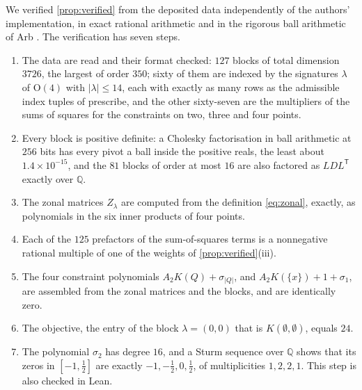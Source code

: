 \documentclass[11pt,reqno]{amsart}
\renewcommand{\_}{\origunderscore\allowbreak}
\numberwithin{equation}{section}
\theoremstyle{plain}
\theoremstyle{definition}
\theoremstyle{remark}
\begin{document}
We verified \cref{prop:verified} from the deposited data independently
of the authors' implementation, in exact rational arithmetic and in the
rigorous ball arithmetic of Arb \cite{Joh17}. The verification has seven
steps.
\begin{enumerate}[label=\textup{\arabic*.},leftmargin=2em,itemsep=0.12em]
\item The data are read and their format checked: $127$ blocks of total
      dimension $3726$, the largest of order $350$; sixty of them are
      indexed by the signatures $\lambda$ of $\mathrm O(4)$ with
      $|\lambda|\le14$, each with exactly as many rows as the admissible
      index tuples of \cite[\S3]{LLM24} prescribe, and the other
      sixty-seven are the multipliers of the sums of squares for the
      constraints on two, three and four points.
\item Every block is positive definite: a Cholesky factorisation in ball
      arithmetic at $256$ bits has every pivot a ball inside the positive
      reals, the least about $1.4\times10^{-15}$, and the $81$ blocks of
      order at most $16$ are also factored as $LDL^{\mathsf T}$ exactly
      over $\mathbb Q$.
\item The zonal matrices $Z_\lambda$ are computed from the definition
      \eqref{eq:zonal}, exactly, as polynomials in the six inner products
      of four points.
\item Each of the $125$ prefactors of the sum-of-squares terms is a
      nonnegative rational multiple of one of the weights of
      \cref{prop:verified}(iii).
\item The four constraint polynomials $A_2K(Q)+\sigma_{|Q|}$, and
      $A_2K(\{x\})+1+\sigma_1$, are assembled from the zonal matrices and
      the blocks, and are identically zero.
\item The objective, the entry of the block $\lambda=(0,0)$ that is
      $K(\emptyset,\emptyset)$, equals $24$.
\item The polynomial $\sigma_2$ has degree $16$, and a Sturm sequence
      over $\mathbb Q$ shows that its zeros in $[-1,\tfrac12]$ are exactly
      $-1,-\tfrac12,0,\tfrac12$, of multiplicities $1,2,2,1$. This step is
      also checked in Lean.
\end{enumerate}
\end{document}
